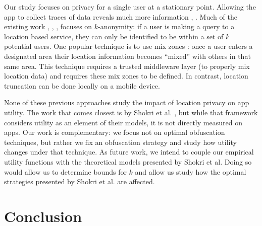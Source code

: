 \documentclass[10pt, conference, compsocconf]{IEEEtran}
\newcommand{\comment}[3][\color{red}]{{#1{[{#2}: {#3}]}}}
\newcommand{\jeff}[1]{\comment[\color{green}]{JSF}{#1}}
\begin{document}
{Our study focuses on privacy for a single user at a stationary point.
Allowing the app to collect traces of data reveals much more
information \cite{Gruteser:2005}, \cite{Golle:2009}.  Much of the
existing work \cite{Beresford:2004}, \cite{Bettini:2005},
\cite{Hoh:2005}, \cite{Gruteser:2003} focuses on $k$-anonymity: if a
user is making a query to a location based service, they can only be
identified to be within a set of $k$ potential users.  
One popular
technique is to use mix zones \cite{Beresford:2004}: once a user enters 
a designated area their location information becomes ``mixed'' with 
others in that same area.  This technique requires a trusted middleware 
layer (to properly mix location data) and requires these mix zones 
to be defined.  In contrast, location truncation can be done locally
on a mobile device.

None of these previous approaches study the impact of location privacy
on app utility.  The work that comes closest is by Shokri et
al. \cite{Shokri:2012}, but while that framework considers utility as
an element of their models, it is not directly measured on apps.  Our
work is complementary: we focus not on optimal obfuscation techniques,
but rather we fix an obfuscation strategy and study how utility
changes under that technique.  As future work, we intend to couple our 
empirical utility functions with the theoretical models presented by
Shokri et al.
Doing so would allow us to determine bounds for $k$ and allow us study 
how the optimal strategies presented by Shokri et al.
are affected.


\section{Conclusion}

}
\end{document}

